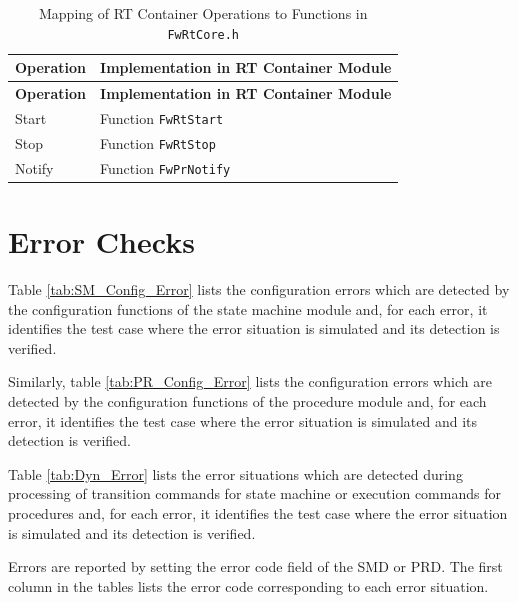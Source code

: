 \documentclass[a4paper,10pt]{article}
\let\stdsection\section
\renewcommand\section{\newpage\stdsection}
\begin{document}
\begin{longtable}{|p{3.7cm}|p{7.5cm}|}
\caption{Mapping of RT Container Operations to Functions in \texttt{FwRtCore.h}} 
\label{tab:RT_Operations_Implementation}\\
\hline
\rowcolor{gray}
\textbf{Operation} & \textbf{Implementation in RT Container Module} \\
\hline
\endfirsthead
\rowcolor{gray}
\textbf{Operation} & \textbf{Implementation in RT Container Module} \\
\hline
\endhead
Start & Function \texttt{FwRtStart} \\
\hline
Stop  & Function \texttt{FwRtStop} \\
\hline
Notify & Function \texttt{FwPrNotify} \\
\hline
\end{longtable}




\section{Error Checks}\label{Appendix_B_Error_Checks}
Table \ref{tab:SM_Config_Error} lists the configuration errors which are detected by 
the configuration functions of the state machine module and, for each error, it 
identifies the test case where the error situation is simulated 
and its detection is verified.

Similarly, table \ref{tab:PR_Config_Error} lists the configuration errors which are 
detected by the configuration functions of the procedure module and, for each error, 
it identifies the test case where the error situation is simulated and its detection is verified.

Table \ref{tab:Dyn_Error} lists the error situations which are detected during processing 
of transition commands for state machine or execution commands for procedures and, for each error, it identifies the test case where the error situation is simulated and its detection is verified.

Errors are reported by setting the error code field of the SMD or PRD. 
The first column in the tables lists the error code corresponding to each error situation.
\end{document}
